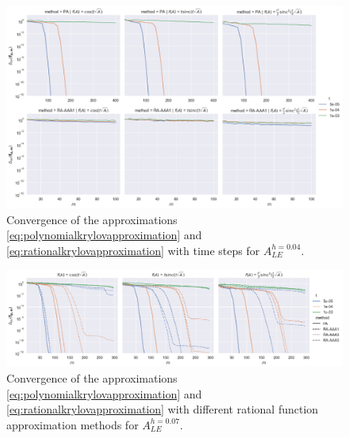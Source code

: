 \begin{figure}[h]
    \centering
    \includegraphics[width=.9\textwidth]{img/trigonometric/cnvg_h4e-02_methods_PA:RA.png}
    \caption{
        Convergence of the approximations \eqref{eq:polynomialkrylovapproximation}
        and \eqref{eq:rationalkrylovapproximation} with time steps for $A_{LE}^{h=0.04}$.
        }
        \label{fig:trigonometricconvergencetimesteps}
\end{figure}

\begin{figure}[h]
        \centering
        \includegraphics[width=.9\textwidth]{img/trigonometric/cnvg_h7e-02_methods.png}
        \caption{
            Convergence of the approximations \eqref{eq:polynomialkrylovapproximation}
            and \eqref{eq:rationalkrylovapproximation} with different
            rational function approximation methods for $A_{LE}^{h=0.07}$.
        }
        \label{fig:trigonometricconvergencemethods}
\end{figure}
